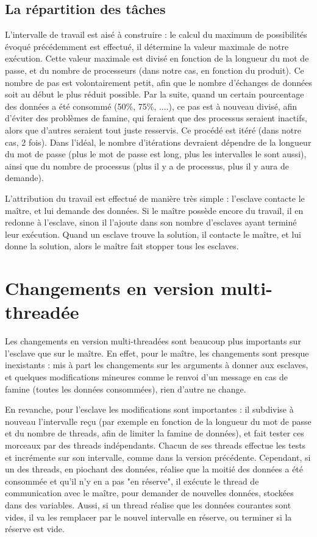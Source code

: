 \documentclass[a4paper,11pt]{article}
\begin{document}
\subsection{La répartition des tâches}
L'intervalle de travail est aisé à construire : le calcul du maximum de possibilités évoqué précédemment est effectué, il détermine la valeur maximale de notre exécution.
Cette valeur maximale est divisé en fonction de la longueur du mot de passe, et du nombre de processeurs (dans notre cas, en fonction du produit).
Ce nombre de pas est volontairement petit, afin que le nombre d'échanges de données soit au début le plus réduit possible.
Par la suite,  quand un certain pourcentage des données a été consommé (50\%, 75\%, ....), ce pas est à nouveau divisé, afin d'éviter des problèmes de famine, qui feraient que des processus seraient inactifs, alors que d'autres seraient tout juste resservis.
Ce procédé est itéré (dans notre cas, 2 fois). Dans l'idéal, le nombre d'itérations devraient dépendre de la longueur du mot de passe (plus le mot de passe est long, plus les intervalles le sont aussi), ainsi que du nombre de processus (plus il y a de processus, plus il y aura de demande).

L'attribution du travail est effectué de manière très simple : l'esclave contacte le maître, et lui demande des données.
Si le maître possède encore du travail, il en redonne à l'esclave, sinon il l'ajoute dans son nombre d'esclaves ayant terminé leur exécution.
Quand un esclave trouve la solution, il contacte le maître, et lui donne la solution, alors le maître fait stopper tous les esclaves.

\section{Changements en version multi-threadée}
Les changements en version multi-threadées sont beaucoup plus importants sur l'esclave que sur le maître.
En effet, pour le maître, les changements sont presque inexistants : mis à part les changements sur les arguments à donner aux esclaves, et quelques modifications mineures comme le renvoi d'un message en cas de famine (toutes les données consommées), rien d'autre ne change.

En revanche, pour l'esclave les modifications sont importantes : il subdivise à nouveau l'intervalle reçu (par exemple en fonction de la longueur du mot de passe et du nombre de threads, afin de limiter la famine de données), et fait tester ces morceaux par des threads indépendants.
Chacun de ses threads effectue les tests et incrémente sur son intervalle, comme dans la version précédente. 
Cependant, si un des threads, en piochant des données, réalise que la moitié des données a été consommée et qu'il n'y en a pas "en réserve", il exécute le thread de communication avec le maître, pour demander de nouvelles données, stockées dans des variables.
Aussi, si un thread réalise que les données courantes sont vides, il va les remplacer par le nouvel intervalle en réserve, ou terminer si la réserve est vide.
\end{document}
